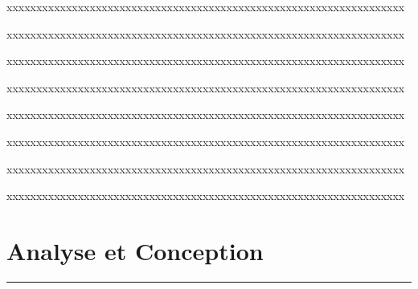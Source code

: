\documentclass[12pt]{report}
\begin{document}
	 xxxxxxxxxxxxxxxxxxxxxxxxxxxxxxxxxxxxxxxxxxxxxxxxxxxxxxxxxxxxxxxxxxx
	 
	 xxxxxxxxxxxxxxxxxxxxxxxxxxxxxxxxxxxxxxxxxxxxxxxxxxxxxxxxxxxxxxxxxxx
	 
	 xxxxxxxxxxxxxxxxxxxxxxxxxxxxxxxxxxxxxxxxxxxxxxxxxxxxxxxxxxxxxxxxxxx
	 
	 xxxxxxxxxxxxxxxxxxxxxxxxxxxxxxxxxxxxxxxxxxxxxxxxxxxxxxxxxxxxxxxxxxx
	 
	  xxxxxxxxxxxxxxxxxxxxxxxxxxxxxxxxxxxxxxxxxxxxxxxxxxxxxxxxxxxxxxxxxxx
	  
	  xxxxxxxxxxxxxxxxxxxxxxxxxxxxxxxxxxxxxxxxxxxxxxxxxxxxxxxxxxxxxxxxxxx
	  
	  xxxxxxxxxxxxxxxxxxxxxxxxxxxxxxxxxxxxxxxxxxxxxxxxxxxxxxxxxxxxxxxxxxx
	  
	  xxxxxxxxxxxxxxxxxxxxxxxxxxxxxxxxxxxxxxxxxxxxxxxxxxxxxxxxxxxxxxxxxxx

	\newpage
	\section{\sc Analyse et Conception}
		\rule{1 \textwidth}{0.5pt} \textbf{}
		
\end{document}
